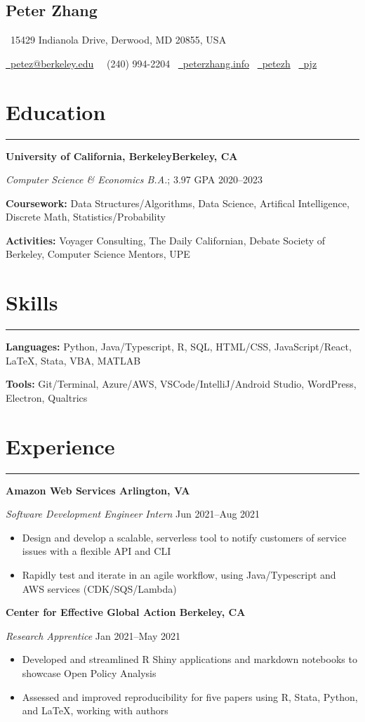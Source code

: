\documentclass[11pt]{article}
\newcommand{\name}[1]{\begin{center}\section*{\huge \color{highlight} #1}\vspace{-0.5cm}\end{center}}
\newcommand{\topinfo}[1]{\begin{center}\vspace{-0.2cm}#1\vspace{-0.2cm}\end{center}}
\newcommand{\resumesection}[1]{\vspace{-0.6cm}\section*{\color{highlight}#1}\vspace{-0.3cm}\hrule\vspace{0.2cm}}
\begin{document}
\name{Peter Zhang}
\topinfo{\faHome \ 15429 Indianola Drive, Derwood, MD 20855, USA}
\topinfo{\href{mailto:petez@berkeley.edu}{\faEnvelope \ petez@berkeley.edu} \ \faPhone \ (240) 994-2204 \ \href{https://peterzhang.info/}{\faBriefcase \ peterzhang.info} \  \href{https://github.com/petezh}{\faGithub \ petezh} \  \href{https://www.linkedin.com/in/pjz/}{\faLinkedinSquare \ pjz}}

\resumesection{Education}

\textbf{University of California, Berkeley\hfill Berkeley, CA} \par
\textit{Computer Science \& Economics B.A.}; 3.97 GPA \hfill 2020--2023\par
\textbf{Coursework:} Data Structures/Algorithms, Data Science, Artifical Intelligence, Discrete Math, Statistics/Probability\par
\textbf{Activities:} Voyager Consulting, The Daily Californian, Debate Society of Berkeley, Computer Science Mentors, UPE

\resumesection{Skills}

\textbf{Languages:} Python, Java/Typescript, R, SQL, HTML/CSS, JavaScript/React, \LaTeX, Stata, VBA, MATLAB \par
\textbf{Tools:} Git/Terminal, Azure/AWS, VSCode/IntelliJ/Android Studio, WordPress, Electron, Qualtrics
\resumesection{Experience}

\textbf{Amazon Web Services \hfill Arlington, VA}\par

\textit{Software Development Engineer Intern} \hfill Jun 2021--Aug 2021
\begin{itemize}
	\item Design and develop a scalable, serverless tool to notify customers of service issues with a flexible API and CLI
	\item Rapidly test and iterate in an agile workflow, using Java/Typescript and AWS services (CDK/SQS/Lambda)
\end{itemize}\par

\textbf{Center for Effective Global Action \hfill Berkeley, CA}\par

\textit{Research Apprentice} \hfill Jan 2021--May 2021
\begin{itemize}
	\item Developed and streamlined R Shiny applications and markdown notebooks to showcase Open Policy Analysis
	\item Assessed and improved reproducibility for five papers using R, Stata, Python, and \LaTeX, working with authors
\end{itemize}\par
\end{document}
